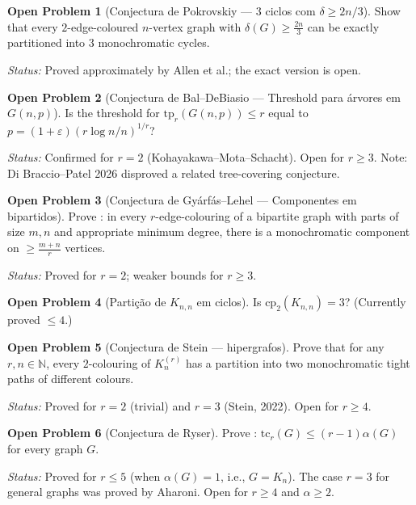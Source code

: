 \documentclass[12pt,a4paper,twoside,openright]{book}
\theoremstyle{definition}
\newtheorem{problem}{Open Problem}[chapter]
\begin{document}
\begin{problem}[Conjectura de Pokrovskiy — 3 ciclos com $\delta \geq 2n/3$]
Show that every $2$-edge-coloured $n$-vertex graph with $\delta(G) \geq \frac{2n}{3}$ can be exactly
partitioned into $3$ monochromatic cycles.

\medskip\noindent
\textit{Status:} Proved approximately by Allen et al.; the exact version is open.
\end{problem}

\begin{problem}[Conjectura de Bal--DeBiasio — Threshold para árvores em $G(n,p)$]
Is the threshold for $\mathrm{tp}_r(G(n,p)) \leq r$ equal to $p = (1+\varepsilon)(r\log n/n)^{1/r}$?

\medskip\noindent
\textit{Status:} Confirmed for $r=2$ (Kohayakawa--Mota--Schacht). Open for $r \geq 3$.
Note: Di Braccio--Patel 2026 disproved a related tree-covering conjecture.
\end{problem}

\begin{problem}[Conjectura de Gyárfás--Lehel — Componentes em bipartidos]
Prove : in every $r$-edge-colouring of a bipartite graph with parts of size $m,n$
and appropriate minimum degree, there is a monochromatic component on $\geq \frac{m+n}{r}$ vertices.

\medskip\noindent
\textit{Status:} Proved for $r=2$; weaker bounds for $r \geq 3$.
\end{problem}

\begin{problem}[Partição de $K_{n,n}$ em ciclos]
Is $\mathrm{cp}_2(K_{n,n}) = 3$? (Currently proved $\leq 4$.)
\end{problem}

\begin{problem}[Conjectura de Stein — hipergrafos]
Prove that for any $r, n \in \mathbb{N}$, every $2$-colouring of $K_n^{(r)}$ has a partition
into two monochromatic tight paths of different colours.

\medskip\noindent
\textit{Status:} Proved for $r=2$ (trivial) and $r=3$ (Stein, 2022). Open for $r \geq 4$.
\end{problem}

\begin{problem}[Conjectura de Ryser]\label{prob:ryser}
Prove : $\mathrm{tc}_r(G) \leq (r-1)\alpha(G)$ for every graph $G$.

\medskip\noindent
\textit{Status:} Proved for $r \leq 5$ (when $\alpha(G)=1$, i.e., $G=K_n$).
The case $r=3$ for general graphs was proved by Aharoni. Open for $r \geq 4$ and $\alpha \geq 2$.
\end{problem}
\end{document}
